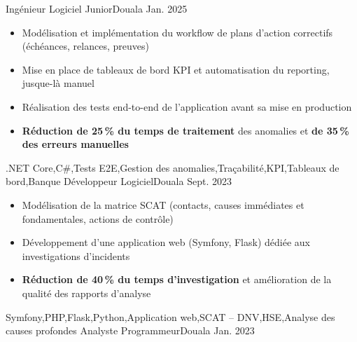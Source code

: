 \begin{experiences}
  \emptySeparator
     {Ingénieur Logiciel Junior}{}{Douala}
    {Jan. 2025} {
                      \begin{itemize}
                        \item Modélisation et implémentation du workflow de plans d'action correctifs (échéances, relances, preuves)
                        \item Mise en place de tableaux de bord KPI et automatisation du reporting, jusque-là manuel
                        \item Réalisation des tests end-to-end de l'application avant sa mise en production
                        \item \textbf{Réduction de 25\,\% du temps de traitement} des anomalies et \textbf{de 35\,\% des erreurs manuelles}
                      \end{itemize}
                    }
                    {.NET Core,C\#,Tests E2E,Gestion des anomalies,Traçabilité,KPI,Tableaux de bord,Banque}
  \emptySeparator
     {Développeur Logiciel}{}{Douala}
    {Sept. 2023} {
                      \begin{itemize}
                        \item Modélisation de la matrice SCAT (contacts, causes immédiates et fondamentales, actions de contrôle)
                        \item Développement d'une application web (Symfony, Flask) dédiée aux investigations d'incidents
                        \item \textbf{Réduction de 40\,\% du temps d'investigation} et amélioration de la qualité des rapports d'analyse
                      \end{itemize}
                    }
                    {Symfony,PHP,Flask,Python,Application web,SCAT -- DNV,HSE,Analyse des causes profondes}
  \emptySeparator
     {Analyste Programmeur}{}{Douala}
    {Jan. 2023} {
                      \begin{itemize}

\end{itemize}}
\end{experiences}
